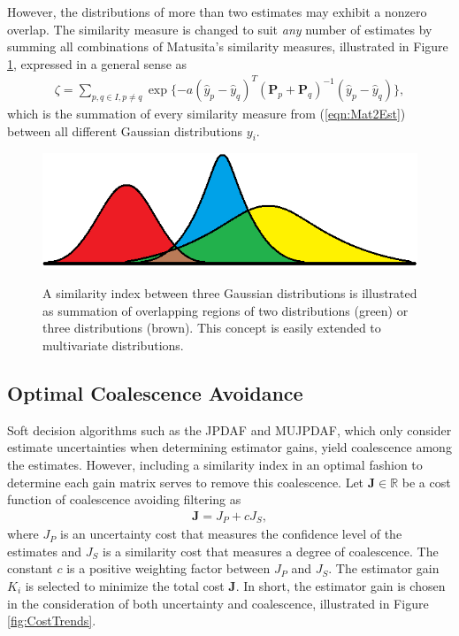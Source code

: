\documentclass[letterpaper, paper,10pt]{AAS}		%
\newcommand{\refeqn}[1]{(\ref{eqn:#1})}
\renewcommand{\Re}{\ensuremath{\mathbb{R}}}
\begin{document}
However, the distributions of more than two estimates may exhibit a nonzero overlap.
The similarity measure is changed to suit \emph{any} number of estimates by summing all combinations of Matusita's similarity measures, illustrated in Figure \ref{fig:SimMeas}, expressed in a general sense as
\begin{align}
\label{eqn:zetaGeneral}
\zeta=\sum\limits_{p,q\in I,p\neq q}\exp \{-a(\hat y_{p}- \hat y_{q})^T({\mathbf P}_{p}
+{\mathbf P}_{q})^{-1}(\hat y_{p}-\hat y_{q})\},
\end{align}
which is the summation of every similarity measure from \refeqn{Mat2Est} between all different Gaussian distributions $y_i$.
\begin{figure}
\centerline{
		{\includegraphics[width=.7\columnwidth]{GaussianDistOverlap1D.png}}
	}
\caption{A similarity index between three Gaussian distributions is illustrated as summation of overlapping regions of two distributions (green) or three distributions (brown).
This concept is easily extended to multivariate distributions.
}\label{fig:SimMeas}
\end{figure}

	
\subsection{Optimal Coalescence Avoidance}

Soft decision algorithms such as the JPDAF and MUJPDAF, which only consider estimate uncertainties when determining estimator gains, yield coalescence among the estimates.
However, including a similarity index in an optimal fashion to determine each gain matrix serves to remove this coalescence.
Let $\mathbf{J}\in\Re$ be a cost function of coalescence avoiding filtering as
\begin{align}
\mathbf{J}=J_P+cJ_S,
\end{align}
where $J_P$ is an uncertainty cost that measures the confidence level of the estimates and $J_S$ is a similarity cost that measures a degree of coalescence. The constant $c$ is a positive weighting factor between $J_P$ and $J_S$. 
The estimator gain $K_i$ is selected to minimize the total cost $\mathbf{J}$.
In short, the estimator gain is chosen in the consideration of both uncertainty and coalescence, illustrated in Figure \ref{fig:CostTrends}.
\end{document}
